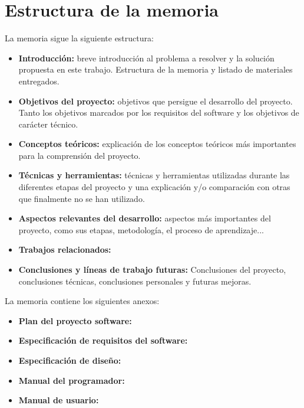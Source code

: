 \section{Estructura de la memoria}\label{estructura-de-la-memoria}

La memoria sigue la siguiente estructura:

\begin{itemize}
\tightlist
\item
  \textbf{Introducción:} breve introducción al problema a resolver y la
  solución propuesta en este trabajo. Estructura de la memoria y listado de materiales
  entregados.
\item
  \textbf{Objetivos del proyecto:} objetivos que
  persigue el desarrollo del proyecto. Tanto los objetivos marcados por los requisitos del software y los objetivos de carácter técnico.
\item
  \textbf{Conceptos teóricos:} explicación de los conceptos teóricos más importantes para la comprensión del proyecto.
\item
  \textbf{Técnicas y herramientas:} técnicas y herramientas utilizadas durante las diferentes etapas del proyecto y una explicación y/o comparación con otras que finalmente no se han utilizado.
\item
  \textbf{Aspectos relevantes del desarrollo:} aspectos más importantes del proyecto, como sus etapas, metodología, el proceso de aprendizaje...
\item
  \textbf{Trabajos relacionados:} 
\item
  \textbf{Conclusiones y líneas de trabajo futuras:} Conclusiones del proyecto, conclusiones técnicas, conclusiones personales y futuras mejoras.
\end{itemize}

La memoria contiene los siguientes anexos:

\begin{itemize}
\tightlist
\item
  \textbf{Plan del proyecto software:} 
\item
  \textbf{Especificación de requisitos del software:}
\item
  \textbf{Especificación de diseño:} 
\item
  \textbf{Manual del programador:} 
\item
  \textbf{Manual de usuario:} 
\end{itemize}





